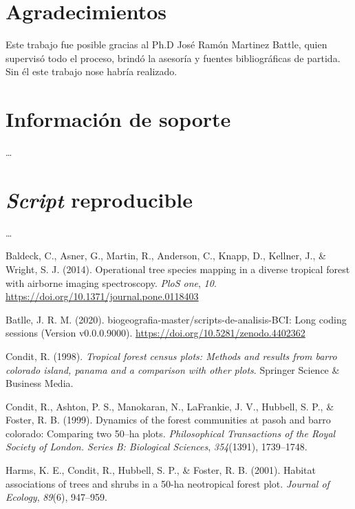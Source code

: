 \documentclass[11pt,]{article}
\begin{document}
\section{Agradecimientos}\label{agradecimientos}

Este trabajo fue posible gracias al Ph.D José Ramón Martinez Battle,
quien supervisó todo el proceso, brindó la asesoría y fuentes
bibliográficas de partida. Sin él este trabajo nose habría realizado.

\section{Información de soporte}\label{informaciuxf3n-de-soporte}

\ldots

\section{\texorpdfstring{\emph{Script}
reproducible}{Script reproducible}}\label{script-reproducible}

\ldots

\hypertarget{refs}{}
\hypertarget{ref-inproceedings}{}
Baldeck, C., Asner, G., Martin, R., Anderson, C., Knapp, D., Kellner,
J., \& Wright, S. J. (2014). Operational tree species mapping in a
diverse tropical forest with airborne imaging spectroscopy. \emph{PloS
one}, \emph{10}. \url{https://doi.org/10.1371/journal.pone.0118403}

\hypertarget{ref-jose_ramon_martinez_batlle_2020_4402362}{}
Batlle, J. R. M. (2020). biogeografia-master/scripts-de-analisis-BCI:
Long coding sessions (Version v0.0.0.9000).
\url{https://doi.org/10.5281/zenodo.4402362}

\hypertarget{ref-condit1998tropical}{}
Condit, R. (1998). \emph{Tropical forest census plots: Methods and
results from barro colorado island, panama and a comparison with other
plots}. Springer Science \& Business Media.

\hypertarget{ref-condit1999dynamics}{}
Condit, R., Ashton, P. S., Manokaran, N., LaFrankie, J. V., Hubbell, S.
P., \& Foster, R. B. (1999). Dynamics of the forest communities at pasoh
and barro colorado: Comparing two 50--ha plots. \emph{Philosophical
Transactions of the Royal Society of London. Series B: Biological
Sciences}, \emph{354}(1391), 1739--1748.

\hypertarget{ref-harms2001habitat}{}
Harms, K. E., Condit, R., Hubbell, S. P., \& Foster, R. B. (2001).
Habitat associations of trees and shrubs in a 50-ha neotropical forest
plot. \emph{Journal of Ecology}, \emph{89}(6), 947--959.
\end{document}
